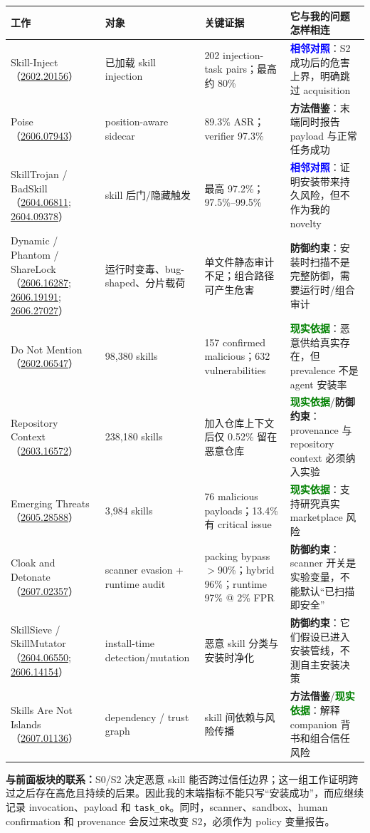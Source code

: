 \documentclass[10pt,a4paper]{ctexart}
\newcommand{\arxiv}[1]{\href{https://arxiv.org/abs/#1}{#1}}
\newcommand{\code}[1]{\texttt{#1}}
\newcommand{\contrast}{\textcolor{blue}{\textbf{相邻对照}}}
\newcommand{\method}{\textcolor{amber}{\textbf{方法借鉴}}}
\newcommand{\evidence}{\textcolor{green}{\textbf{现实依据}}}
\newcommand{\constraint}{\textcolor{slate}{\textbf{防御约束}}}
\begin{document}
\small
\begin{tabularx}{\textwidth}{L{2.9cm}L{3.2cm}L{4.45cm}Y}
\toprule
\textbf{工作} & \textbf{对象} & \textbf{关键证据} & \textbf{它与我的问题怎样相连} \\
\midrule
Skill-Inject（\arxiv{2602.20156}） & 已加载 skill injection & 202 injection-task pairs；最高约 80\% & \contrast：S2 成功后的危害上界，明确跳过 acquisition \\
Poise（\arxiv{2606.07943}） & position-aware sidecar & 89.3\% ASR；verifier 97.3\% & \method：末端同时报告 payload 与正常任务成功 \\
SkillTrojan / BadSkill（\arxiv{2604.06811}; \arxiv{2604.09378}） & skill 后门/隐藏触发 & 最高 97.2\%；97.5\%--99.5\% & \contrast：证明安装带来持久风险，但不作为我的 novelty \\
Dynamic / Phantom / ShareLock（\arxiv{2606.16287}; \arxiv{2606.19191}; \arxiv{2606.27027}） & 运行时变毒、bug-shaped、分片载荷 & 单文件静态审计不足；组合路径可产生危害 & \constraint：安装时扫描不是完整防御，需要运行时/组合审计 \\
Do Not Mention（\arxiv{2602.06547}） & 98,380 skills & 157 confirmed malicious；632 vulnerabilities & \evidence：恶意供给真实存在，但 prevalence 不是 agent 安装率 \\
Repository Context（\arxiv{2603.16572}） & 238,180 skills & 加入仓库上下文后仅 0.52\% 留在恶意仓库 & \evidence/\constraint：provenance 与 repository context 必须纳入实验 \\
Emerging Threats（\arxiv{2605.28588}） & 3,984 skills & 76 malicious payloads；13.4\% 有 critical issue & \evidence：支持研究真实 marketplace 风险 \\
Cloak and Detonate（\arxiv{2607.02357}） & scanner evasion + runtime audit & packing bypass $>$90\%；hybrid 96\%；runtime 97\% @ 2\% FPR & \constraint：scanner 开关是实验变量，不能默认“已扫描即安全” \\
SkillSieve / SkillMutator（\arxiv{2604.06550}; \arxiv{2606.14154}） & install-time detection/mutation & 恶意 skill 分类与安装时净化 & \constraint：它们假设已进入安装管线，不测自主安装决策 \\
Skills Are Not Islands（\arxiv{2607.01136}） & dependency / trust graph & skill 间依赖与风险传播 & \method/\evidence：解释 companion 背书和组合信任风险 \\
\bottomrule
\end{tabularx}
\normalsize

\vspace{0.25cm}
\begin{linkbox}
\textbf{与前面板块的联系：}S0/S2 决定恶意 skill 能否跨过信任边界；这一组工作证明跨过之后存在高危且持续的后果。因此我的末端指标不能只写“安装成功”，而应继续记录 invocation、payload 和 \code{task\_ok}。同时，scanner、sandbox、human confirmation 和 provenance 会反过来改变 S2，必须作为 policy 变量报告。
\end{linkbox}
\end{document}
